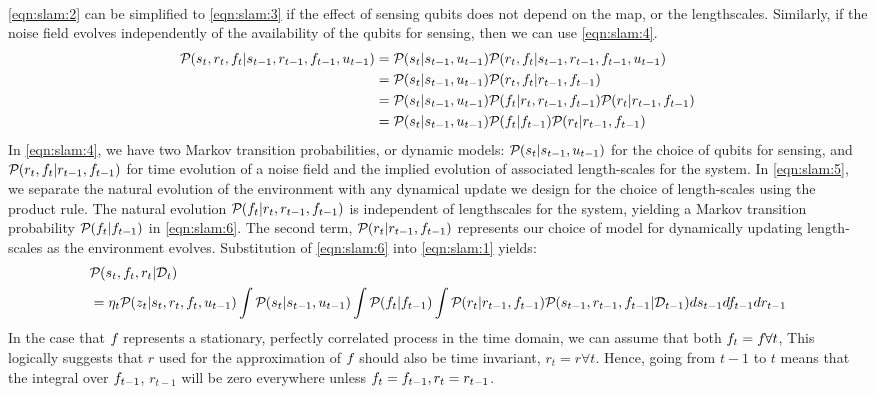 \begin{widetext}
\begin{align}
	\end{align}
	\cref{eqn:slam:2} can be simplified to \cref{eqn:slam:3} if the effect of sensing qubits does not depend on the map, or the lengthscales. Similarly, if the noise field evolves independently of the availability of the qubits for sensing, then we can use \cref{eqn:slam:4}.
	\begin{align}
	\mathcal{P}_{} (  s_t, r_t, f_{ t}| s_{t-1}, r_{t-1}, f_{ t-1},u_{t-1} )  &= \mathcal{P}_{} (  s_t| s_{t-1}, u_{t-1} ) \mathcal{P}_{} (  r_t, f_{ t}| s_{t-1}, r_{t-1}, f_{ t-1},u_{t-1} ) \label{eqn:slam:3} \\
	&= \mathcal{P}_{} (  s_t| s_{t-1}, u_{t-1} ) \mathcal{P}_{} (  r_t, f_{ t}|  r_{t-1}, f_{ t-1} ) \label{eqn:slam:4}  \\
	&= \mathcal{P}_{} (  s_t| s_{t-1}, u_{t-1} ) \mathcal{P}_{} (   f_{ t}|  r_t, r_{t-1}, f_{ t-1} ) \mathcal{P}_{} (  r_t|  r_{t-1}, f_{ t-1} ) \label{eqn:slam:5} \\
	&= \mathcal{P}_{} (  s_t| s_{t-1}, u_{t-1} ) \mathcal{P}_{} (  f_{ t}|  f_{ t-1} ) \mathcal{P}_{} (  r_t|  r_{t-1}, f_{ t-1} ) \label{eqn:slam:6} 
	\end{align} In \cref{eqn:slam:4}, we have two Markov transition probabilities, or dynamic models:  $\mathcal{P}_{} (  s_t| s_{t-1}, u_{t-1} )$ for the choice of qubits for sensing, and $\mathcal{P}_{} (  r_t, f_{ t}|  r_{t-1}, f_{ t-1} )$ for time evolution of a noise field and the implied evolution of associated length-scales for the system. In \cref{eqn:slam:5}, we separate the natural evolution of the environment with any dynamical update we design for the choice of length-scales using the product rule. The natural evolution $\mathcal{P}_{} (   f_{ t}|  r_t, r_{t-1}, f_{ t-1} ) $  is independent of lengthscales for the system, yielding a Markov transition probability $\mathcal{P}_{} (  f_{ t}|  f_{ t-1} )$ in \cref{eqn:slam:6}. The second term, $\mathcal{P}_{} (  r_t|  r_{t-1}, f_{ t-1} )$ represents our choice of model for dynamically updating length-scales as the environment evolves. Substitution of  \cref{eqn:slam:6}  into \cref{eqn:slam:1} yields:
	\begin{align}
	&\mathcal{P}_{} ( s_t, f_{ t}, r_t | \mathcal{D}_t ) \nonumber \\
	& = \eta_t\mathcal{P}_{} ( z_t | s_t, r_t, f_{ t}, u_{t-1} ) \int \mathcal{P}_{} (  s_t| s_{t-1}, u_{t-1} )  \int \mathcal{P}_{} (  f_{ t}|  f_{ t-1} ) \int \mathcal{P}_{} (  r_t|  r_{t-1}, f_{ t-1} ) \mathcal{P}_{} ( s_{t-1}, r_{t-1}, f_{ t-1}| \mathcal{D}_{t-1} )  ds_{t-1} df_{ t-1} dr_{t-1}   \label{eqn:slam:7} 
	\end{align} 
	In the case that $f_{ }$ represents a stationary, perfectly correlated process in the time domain, we can assume that both $f_{ t} = f_{ } \forall t$, This logically suggests that $r$ used for the approximation of $f_{ }$ should also be time invariant, $r_t = r \forall t$. Hence, going from $t-1$ to $t$ means that the integral over $f_{ t-1}$, $r_{t-1}$ will be zero everywhere unless $f_{ t}=f_{ t-1}, r_t = r_{t-1}$. 

\end{widetext}
